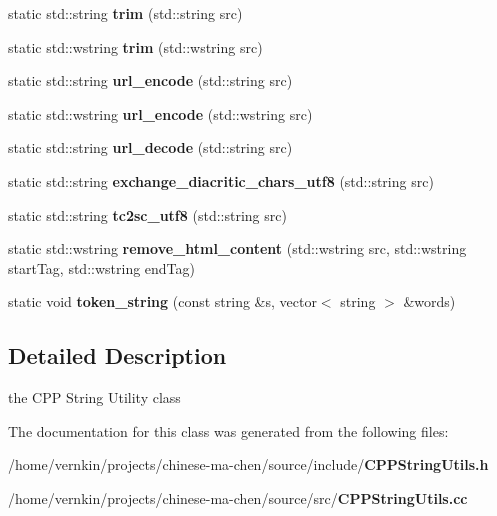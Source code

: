 \begin{DoxyCompactItemize}
\item 
static std::string {\bfseries trim} (std::string src)\label{classCPPStringUtils_ab7a95fcceb8e9f6b6057a18e7b1c2f53}

\item 
static std::wstring {\bfseries trim} (std::wstring src)\label{classCPPStringUtils_a07879a0daa3a9f7cd25a049748c41db3}

\item 
static std::string {\bfseries url\_\-encode} (std::string src)\label{classCPPStringUtils_a14302e8f40ec5a1f50438ce2bedf6c5b}

\item 
static std::wstring {\bfseries url\_\-encode} (std::wstring src)\label{classCPPStringUtils_a57bcbcff310f55d63c05ef58c3fdca9e}

\item 
static std::string {\bfseries url\_\-decode} (std::string src)\label{classCPPStringUtils_a30f71ace44cdd9bae744c018c36a96a7}

\item 
static std::string {\bfseries exchange\_\-diacritic\_\-chars\_\-utf8} (std::string src)\label{classCPPStringUtils_a3e08b33f820af5fd7dae1d5f36752883}

\item 
static std::string {\bfseries tc2sc\_\-utf8} (std::string src)\label{classCPPStringUtils_a24d84b208e576d598d10b6558ca97953}

\item 
static std::wstring {\bfseries remove\_\-html\_\-content} (std::wstring src, std::wstring startTag, std::wstring endTag)\label{classCPPStringUtils_a4b042a97935f3bc248c10967b45e9fa6}

\item 
static void {\bfseries token\_\-string} (const string \&s, vector$<$ string $>$ \&words)\label{classCPPStringUtils_ac038f1e9530c1b53edaeea1bb5d8e547}

\end{DoxyCompactItemize}


\subsection{Detailed Description}
the CPP String Utility class 

The documentation for this class was generated from the following files:\begin{DoxyCompactItemize}
\item 
/home/vernkin/projects/chinese-\/ma-\/chen/source/include/{\bf CPPStringUtils.h}\item 
/home/vernkin/projects/chinese-\/ma-\/chen/source/src/{\bf CPPStringUtils.cc}\end{DoxyCompactItemize}
